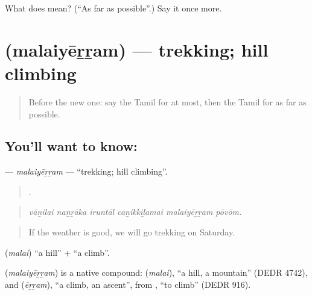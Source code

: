 \begin{tcolorbox}[breakable,colback=teal!4,colframe=teal!35!black,title={Before you move on}]
What does  mean? (\textquotedblleft{}As far as possible\textquotedblright{}.) Say it once more.
\end{tcolorbox}
\section[\texorpdfstring{\ta{மலையேற்றம்} (malaiyēṟṟam)}{மலையேற்றம் (malaiyēṟṟam)}]{ (malaiyēṟṟam) — trekking; hill climbing}

\label{lesson:TA-C554-malaiyerram}



\begin{quote}
Before the new one: say the Tamil for at most, then the Tamil for as far as possible.
\end{quote}

\subsection*{You'll want to know: }
\textbf{} — \emph{malaiyēṟṟam} — \textquotedblleft{}trekking; hill climbing\textquotedblright{}.

\begin{quote}
     .
\end{quote}

\begin{quote}
\emph{vāṉilai naṉṟāka iruntāl caṉikkiḻamai malaiyēṟṟam pōvōm.}
\end{quote}

\begin{quote}
If the weather is good, we will go trekking on Saturday.
\end{quote}

 (\emph{malai}) \textquotedblleft{}a hill\textquotedblright{} +  \textquotedblleft{}a climb\textquotedblright{}.

\begin{cousinweb}
\textbf{} (\emph{malaiyēṟṟam}) is a native compound:  (\emph{malai}), \textquotedblleft{}a hill, a mountain\textquotedblright{} (DEDR 4742), and  (\emph{ēṟṟam}), \textquotedblleft{}a climb, an ascent\textquotedblright{}, from , \textquotedblleft{}to climb\textquotedblright{} (DEDR 916).
\end{cousinweb}

